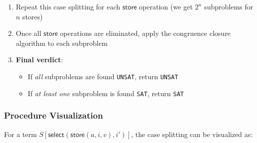 \documentclass[11pt,a4paper]{article}
\theoremstyle{definition}
\theoremstyle{plain}
\theoremstyle{remark}
\begin{document}
\begin{tcolorbox}[colback=green!5!white,colframe=green!75!black,title=\textbf{Array Theory Decision Procedure}]
\begin{enumerate}
\begin{itemize}
        \item \textbf{Subproblem 2}: $i \not\backsimeq i'$ (indices are different)
        
        Replace $\textsf{select}(\textsf{store}(a, i, v), i')$ with $\textsf{select}(a, i')$ (the store is irrelevant)
    \end{itemize}
    
    \item Repeat this case splitting for each $\textsf{store}$ operation (we get $2^n$ subproblems for $n$ stores)
    
    \item Once all $\textsf{store}$ operations are eliminated, apply the congruence closure algorithm to each subproblem
    
    \item \textbf{Final verdict}:
    \begin{itemize}
        \item If \textit{all} subproblems are found \texttt{UNSAT}, return \texttt{UNSAT}
        \item If \textit{at least one} subproblem is found \texttt{SAT}, return \texttt{SAT}
    \end{itemize}
\end{enumerate}
\end{tcolorbox}

\subsubsection{Procedure Visualization}

For a term $S[\textsf{select}(\textsf{store}(a, i, v), i')]$, the case splitting can be visualized as:

\begin{center}
\end{center}
\end{document}
